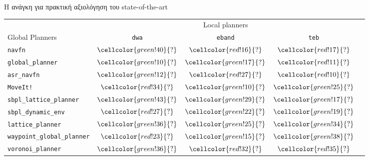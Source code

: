 \begin{frame}{Η ανάγκη για πρακτική αξιολόγηση του state-of-the-art}
{\footnotesize
\begin{table}[h]
\begin{tabular}{lcccc}
  & \multicolumn{3}{c}{Local planners} \\
  \cline{2-4}
  Global Planners                     & \texttt{dwa}                               & \texttt{eband}                             & \texttt{teb} \\ \toprule
  \texttt{navfn}                     & $\cellcolor{green!40}{?}$         & $\cellcolor{red!16}{?}$            & $\cellcolor{red!17}{?}$         \\
  \texttt{global\_planner}           & $\cellcolor{green!10}{?}$         & $\cellcolor{green!17}{?}$            & $\cellcolor{red!11}{?}$         \\
  \texttt{asr\_navfn}                & $\cellcolor{green!12}{?}$         & $\cellcolor{red!27}{?}$            & $\cellcolor{red!10}{?}$         \\
  \texttt{MoveIt!}                   & $\cellcolor{red!34}{?}$         & $\cellcolor{green!10}{?}$            & $\cellcolor{green!25}{?}$         \\
  \texttt{sbpl\_lattice\_planner}    & $\cellcolor{green!43}{?}$         & $\cellcolor{green!29}{?}$            & $\cellcolor{green!17}{?}$         \\
  \texttt{sbpl\_dynamic\_env}        & $\cellcolor{red!27}{?}$         & $\cellcolor{green!22}{?}$            & $\cellcolor{green!19}{?}$         \\
  \texttt{lattice\_planner}          & $\cellcolor{green!36}{?}$         & $\cellcolor{green!25}{?}$            & $\cellcolor{green!34}{?}$         \\
  \texttt{waypoint\_global\_planner} & $\cellcolor{red!23}{?}$         & $\cellcolor{green!15}{?}$            & $\cellcolor{green!38}{?}$         \\
  \texttt{voronoi\_planner}          & $\cellcolor{green!36}{?}$         & $\cellcolor{red!32}{?}$            & $\cellcolor{red!35}{?}$         \\ \bottomrule
\end{tabular}
\end{table}
}

\end{frame}

